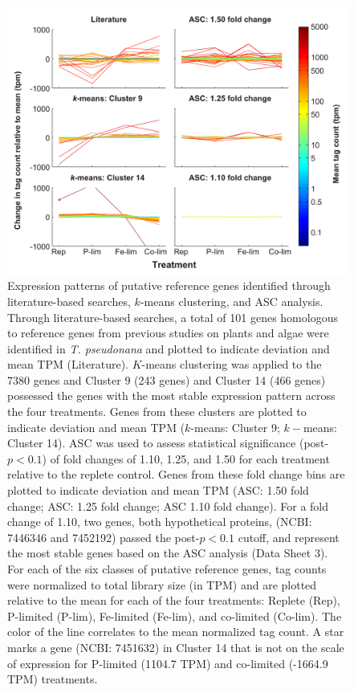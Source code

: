\begin{figure}[h!]
  \centering
    \includegraphics[width=1\textwidth]{Images/C2_Figure1_v6.pdf}
    \caption[Expression patterns of putative reference genes]{Expression patterns of putative reference genes identified through literature-based searches, $k$-means clustering, and ASC analysis. Through literature-based searches, a total of 101 genes homologous to reference genes from previous studies on plants and algae were identified in \textit{T. pseudonana} and plotted to indicate deviation and mean TPM (Literature). $K$-means clustering was applied to the 7380 genes and Cluster 9 (243 genes) and Cluster 14 (466 genes) possessed the genes with the most stable expression pattern across the four treatments. Genes from these clusters are plotted to indicate deviation and mean TPM ($k$-means: Cluster 9; $k-$means: Cluster 14). ASC was used to assess statistical significance (post-$p < 0.1$) of fold changes of 1.10, 1.25, and 1.50 for each treatment relative to the replete control. Genes from these fold change bins are plotted to indicate deviation and mean TPM (ASC: 1.50 fold change; ASC: 1.25 fold change; ASC 1.10 fold change). For a fold change of 1.10, two genes, both hypothetical proteins, (NCBI: 7446346 and 7452192) passed the post-$p < 0.1$ cutoff, and represent the most stable genes based on the ASC analysis (Data Sheet 3). For each of the six classes of putative reference genes, tag counts were normalized to total library size (in TPM) and are plotted relative to the mean for each of the four treatments: Replete (Rep), P-limited (P-lim), Fe-limited (Fe-lim), and co-limited (Co-lim). The color of the line correlates to the mean normalized tag count. A star marks a gene (NCBI: 7451632) in Cluster 14 that is not on the scale of expression for P-limited (1104.7 TPM) and co-limited (-1664.9 TPM) treatments. }
  \label{fig:c2f1}
\end{figure}

